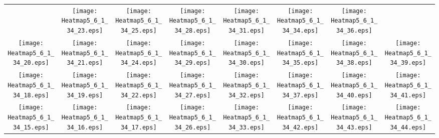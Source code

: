 \documentclass{standalone}
\begin{document}
\renewcommand{\arraystretch}{0}
\setlength{\tabcolsep}{0pt}
\begin{tabular}{ *8{c} }
 & \texttt{[image: Heatmap5\_6\_1\_34\_23.eps]} & \texttt{[image: Heatmap5\_6\_1\_34\_25.eps]} & \texttt{[image: Heatmap5\_6\_1\_34\_28.eps]} & \texttt{[image: Heatmap5\_6\_1\_34\_31.eps]} & \texttt{[image: Heatmap5\_6\_1\_34\_34.eps]} & \texttt{[image: Heatmap5\_6\_1\_34\_36.eps]} &  \\
\texttt{[image: Heatmap5\_6\_1\_34\_20.eps]} & \texttt{[image: Heatmap5\_6\_1\_34\_21.eps]} & \texttt{[image: Heatmap5\_6\_1\_34\_24.eps]} & \texttt{[image: Heatmap5\_6\_1\_34\_29.eps]} & \texttt{[image: Heatmap5\_6\_1\_34\_30.eps]} & \texttt{[image: Heatmap5\_6\_1\_34\_35.eps]} & \texttt{[image: Heatmap5\_6\_1\_34\_38.eps]} & \texttt{[image: Heatmap5\_6\_1\_34\_39.eps]} \\
\texttt{[image: Heatmap5\_6\_1\_34\_18.eps]} & \texttt{[image: Heatmap5\_6\_1\_34\_19.eps]} & \texttt{[image: Heatmap5\_6\_1\_34\_22.eps]} & \texttt{[image: Heatmap5\_6\_1\_34\_27.eps]} & \texttt{[image: Heatmap5\_6\_1\_34\_32.eps]} & \texttt{[image: Heatmap5\_6\_1\_34\_37.eps]} & \texttt{[image: Heatmap5\_6\_1\_34\_40.eps]} & \texttt{[image: Heatmap5\_6\_1\_34\_41.eps]} \\
\texttt{[image: Heatmap5\_6\_1\_34\_15.eps]} & \texttt{[image: Heatmap5\_6\_1\_34\_16.eps]} & \texttt{[image: Heatmap5\_6\_1\_34\_17.eps]} & \texttt{[image: Heatmap5\_6\_1\_34\_26.eps]} & \texttt{[image: Heatmap5\_6\_1\_34\_33.eps]} & \texttt{[image: Heatmap5\_6\_1\_34\_42.eps]} & \texttt{[image: Heatmap5\_6\_1\_34\_43.eps]} & \texttt{[image: Heatmap5\_6\_1\_34\_44.eps]} \\

\end{tabular}
\end{document}
